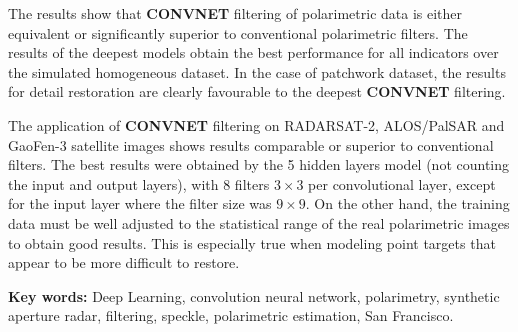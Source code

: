 The results show that \textbf{CONVNET} filtering of polarimetric data is either equivalent or significantly superior to conventional polarimetric filters.  The results of the deepest models obtain the best performance for all indicators over the simulated homogeneous dataset.  In the case of patchwork dataset, the results for detail restoration are clearly favourable to the deepest \textbf{CONVNET} filtering.

The application of \textbf{CONVNET} filtering on RADARSAT-2, ALOS/PalSAR and GaoFen-3 satellite images shows results comparable or superior to conventional filters.  The best results were obtained by the 5 hidden layers model (not counting the input and output layers), with 8 filters $3 \times 3$ per convolutional layer, except for the input layer where the filter size was  $9 \times 9$.  On the other hand, the training data must be well adjusted to the statistical range of the real polarimetric images to obtain good results.  This is especially true when modeling point targets that appear to be more difficult to restore.
\newline

\textbf{Key words:} Deep Learning, convolution neural network, polarimetry, synthetic aperture radar, filtering, speckle, polarimetric estimation, San Francisco.
